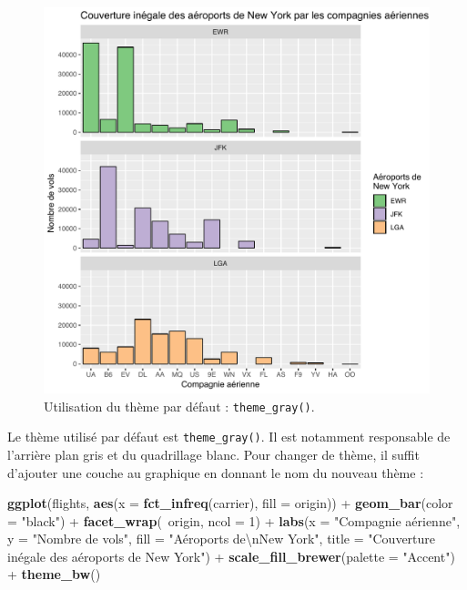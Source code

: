 \documentclass[a4paperpaper,]{article}
\newenvironment{Shaded}{\begin{snugshade}}{\end{snugshade}}
\newcommand{\CharTok}[1]{\textcolor[rgb]{0.57,0.30,0.62}{#1}}
\newcommand{\DataTypeTok}[1]{\textcolor[rgb]{0.00,0.34,0.68}{#1}}
\newcommand{\DecValTok}[1]{\textcolor[rgb]{0.69,0.50,0.00}{#1}}
\newcommand{\KeywordTok}[1]{\textcolor[rgb]{0.12,0.11,0.11}{\textbf{#1}}}
\newcommand{\NormalTok}[1]{\textcolor[rgb]{0.12,0.11,0.11}{#1}}
\newcommand{\OperatorTok}[1]{\textcolor[rgb]{0.12,0.11,0.11}{#1}}
\newcommand{\StringTok}[1]{\textcolor[rgb]{0.75,0.01,0.01}{#1}}
\begin{document}
\begin{figure}[htpb]

{\centering \includegraphics[width=0.9\linewidth]{figure/theme1-1} 

}

\caption{Utilisation du thème par défaut : \texttt{theme\_gray()}.}\label{fig:theme1}
\end{figure}



Le thème utilisé par défaut est \texttt{theme\_gray()}. Il est notamment responsable de l'arrière plan gris et du quadrillage blanc. Pour changer de thème, il suffit d'ajouter une couche au graphique en donnant le nom du nouveau thème :

\begin{Shaded}
\begin{Highlighting}[]
\KeywordTok{ggplot}\NormalTok{(flights, }\KeywordTok{aes}\NormalTok{(}\DataTypeTok{x =} \KeywordTok{fct_infreq}\NormalTok{(carrier), }\DataTypeTok{fill =}\NormalTok{ origin)) }\OperatorTok{+}
\StringTok{  }\KeywordTok{geom_bar}\NormalTok{(}\DataTypeTok{color =} \StringTok{"black"}\NormalTok{) }\OperatorTok{+}
\StringTok{  }\KeywordTok{facet_wrap}\NormalTok{(}\OperatorTok{~}\NormalTok{origin, }\DataTypeTok{ncol =} \DecValTok{1}\NormalTok{) }\OperatorTok{+}
\StringTok{  }\KeywordTok{labs}\NormalTok{(}\DataTypeTok{x =} \StringTok{"Compagnie aérienne"}\NormalTok{,}
       \DataTypeTok{y =} \StringTok{"Nombre de vols"}\NormalTok{,}
       \DataTypeTok{fill =} \StringTok{"Aéroports de}\CharTok{\textbackslash{}n}\StringTok{New York"}\NormalTok{,}
       \DataTypeTok{title =} \StringTok{"Couverture inégale des aéroports de New York"}\NormalTok{) }\OperatorTok{+}
\StringTok{  }\KeywordTok{scale_fill_brewer}\NormalTok{(}\DataTypeTok{palette =} \StringTok{"Accent"}\NormalTok{) }\OperatorTok{+}
\StringTok{  }\KeywordTok{theme_bw}\NormalTok{()}
\end{Highlighting}
\end{Shaded}
\end{document}
